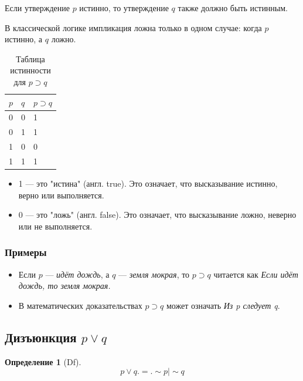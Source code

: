 \documentclass[a4paper, 12pt]{article}
\newtheorem{definition}{Определение}
\begin{document}
Если утверждение $p$ истинно, то утверждение $q$ также должно быть истинным.

В классической логике импликация ложна только в одном случае: когда $p$ истинно, а $q$ ложно.

\begin{table}[h]
    \centering
    \caption{Таблица истинности для $p \supset q$}
    \label{tab:equalwidth}
    \begin{tabularx}{\textwidth}{|X|X|X|}
        \hline
        \textbf{$p$} & \textbf{$q$} & \textbf{$p \supset q$}\\
        \hline
        0 & 0 & 1 \\
        \hline
        0 & 1 & 1 \\
        \hline
        1 & 0 & 0 \\
        \hline
        1 & 1 & 1 \\
        \hline
    \end{tabularx}
\end{table}

\begin{itemize} 
 \item 1 — это "истина" (англ. true). Это означает, что высказывание истинно, верно или выполняется.
 \item 0 — это "ложь" (англ. false). Это означает, что высказывание ложно, неверно или не выполняется.
\end{itemize}

\subsubsection{Примеры}

\begin{itemize} 
 \item Если $p$ — \textit{идёт дождь}, а $q$ — \textit{земля мокрая}, то $p \supset q$ читается как \textit{Если идёт дождь, то земля мокрая.}

 \item В математических доказательствах $p \supset q$ может означать \textit{Из p следует q}.
 
\end{itemize}

\subsection{Дизъюнкция $p \vee q$}

\begin{definition}[Df]
    \[
       p \vee q .=. \sim p \mid \sim q 
    \]
\end{definition}
\end{document}
